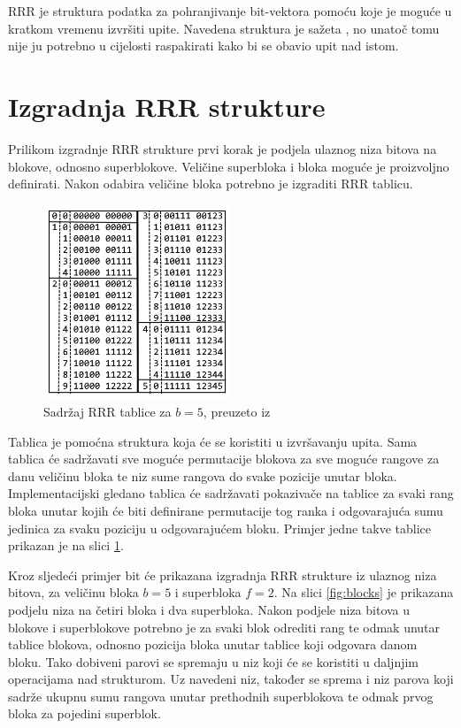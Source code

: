 RRR je struktura podatka za pohranjivanje bit-vektora pomoću koje je moguće u kratkom vremenu izvršiti upite. Navedena struktura je sažeta , no unatoč tomu nije ju potrebno u cijelosti raspakirati kako bi se obavio upit nad istom. 

\section{Izgradnja RRR strukture}

Prilikom izgradnje RRR strukture prvi korak je podjela ulaznog niza bitova na blokove, odnosno superblokove. Veličine superbloka i bloka moguće je proizvoljno definirati. Nakon odabira veličine bloka potrebno je izgraditi RRR tablicu.

\begin{figure}[H]
	\centering
	\includegraphics[width = 0.5\textwidth] {img/rrrtable.png}
	\caption{Sadržaj RRR tablice za $b = 5$, preuzeto iz \cite{breberic}}
	\label{fig:rrrtable}
\end{figure}

Tablica je pomoćna struktura koja će se koristiti u izvršavanju upita. Sama tablica će sadržavati sve moguće permutacije blokova za sve moguće rangove za danu veličinu bloka te niz sume rangova do svake pozicije unutar bloka. Implementacijski gledano tablica će sadržavati pokazivače na tablice za svaki rang bloka unutar kojih će biti definirane permutacije tog ranka i odgovarajuća sumu jedinica za svaku poziciju u odgovarajućem bloku. Primjer jedne takve tablice prikazan je na slici \ref{fig:rrrtable}.

Kroz sljedeći primjer bit će prikazana izgradnja RRR strukture iz ulaznog niza bitova, za veličinu bloka $b=5$ i superbloka $f=2$. Na slici \ref{fig:blocks} je prikazana podjelu niza na četiri bloka i dva superbloka. Nakon podjele niza bitova u blokove i superblokove potrebno je za svaki blok odrediti rang te odmak unutar tablice blokova, odnosno pozicija bloka unutar tablice koji odgovara danom bloku. Tako dobiveni parovi se spremaju u niz koji će se koristiti u daljnjim operacijama nad strukturom. Uz navedeni niz, također se sprema i niz parova koji sadrže ukupnu sumu rangova unutar prethodnih superblokova te odmak prvog bloka za pojedini superblok. 

